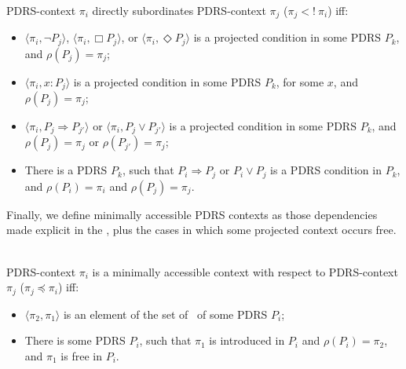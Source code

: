 \begin{definition}~\\
PDRS-context $\pi_i$ directly subordinates PDRS-context $\pi_j$ 
($\pi_j <!~\pi_i$) iff:
  \begin{itemize}
    \item $\langle\pi_i,\neg P_j\rangle$,
      $\langle\pi_i,\Box P_j\rangle$,
      or $\langle\pi_i,\Diamond P_j\rangle$ is a projected condition in
      some PDRS $P_k$, and $\rho(P_j) = \pi_j$;
    \item $\langle\pi_i,x:P_j\rangle$ is a projected condition in some
      PDRS $P_k$, for some $x$, and $\rho(P_j) = \pi_j$;
    \item  $\langle\pi_i,P_j \Rightarrow P_{j'}\rangle$ or
      $\langle\pi_i,P_j \vee P_{j'}\rangle$ is a projected condition in
      some PDRS $P_k$, and $\rho(P_j) = \pi_j$ or $\rho(P_{j'}) = \pi_j$;
    \item There is a PDRS $P_k$, such that $P_i \Rightarrow P_j$ or 
      $P_i \vee P_j$ is a PDRS condition in $P_k$, and $\rho(P_i) = \pi_i$ 
      and $\rho(P_j) = \pi_j$. 
  \end{itemize}
\end{definition}


Finally, we define minimally accessible PDRS contexts as those dependencies
made explicit in the \MAPs, plus the cases in which some projected context
occurs free.

\begin{definition}~\\
PDRS-context $\pi_i$ is a minimally accessible context with
respect to PDRS-context $\pi_j$ ($\pi_j \preceq \pi_i$) iff:
  \begin{itemize}
    \item $\langle \pi_2,\pi_1\rangle$ is an element of the set of
      \MAPs~of some PDRS $P_i$;
    \item There is some PDRS $P_i$, such that $\pi_1$ is introduced in $P_i$
      and $\rho(P_i)=\pi_2$, and $\pi_1$ is free in $P_i$. 
  \end{itemize}
\end{definition}


